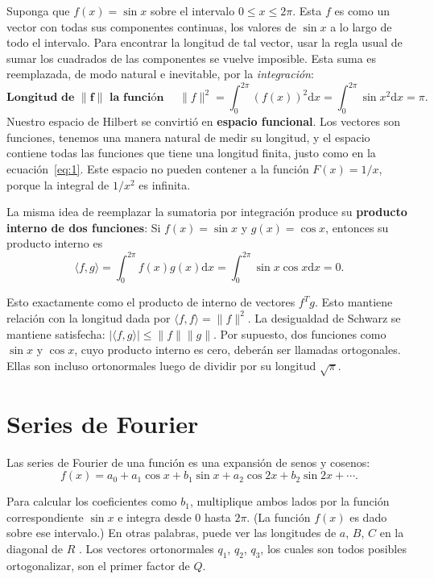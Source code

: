 \documentclass[a4paper]{memoir}
\begin{document}
Suponga que $f(x)=\sin x$ sobre el intervalo $0\le x\le 2\pi$. Esta $f$ es como un vector con todas sus componentes continuas, los valores de $\sin x$ a lo largo de todo el intervalo. Para encontrar la longitud de tal vector, usar la regla usual de sumar los cuadrados de las componentes se vuelve imposible. Esta suma es reemplazada, de modo natural e inevitable, por la \emph{integración}:
\begin{equation}
  \label{eq:2}
  \textbf{Longitud de }\|\bm{f}\|\textbf{ la función }\quad\|f\|^2=\int_0^{2\pi}{(f(x))}^2\mathrm{d}x=\int_0^{2\pi}{\sin x}^2\mathrm{d}x=\pi.
\end{equation}
Nuestro espacio de Hilbert se convirtió en \textbf{espacio funcional}. Los vectores son funciones, tenemos una manera natural de medir su longitud, y el espacio contiene todas las funciones que tiene una longitud finita, justo como en la ecuación~\ref{eq:1}. Este espacio no pueden contener a la función $F(x)=1/x$, porque la integral de $1/x^2$ es infinita.

La misma idea de reemplazar la sumatoria por integración produce su \textbf{producto interno de dos funciones}: Si $f(x)=\sin x$ y $g(x)=\cos x$, entonces su producto interno es
\begin{equation}
  \label{eq:3}
  \langle f,g\rangle={\int}_{0}^{2\pi}f(x)g(x)\mathrm{d}x=\int_{0}^{2\pi}\sin x\cos x\mathrm{d}x=0.
\end{equation}

Esto exactamente como el producto de interno de vectores $f^Tg$. Esto mantiene relación con la longitud dada por $\langle f,f\rangle=\|f\|^2$. La desigualdad de Schwarz se mantiene satisfecha: $|\langle f,g \rangle|\le \|f\|\|g\|$. Por supuesto, dos funciones como $\sin x$ y $\cos x$, cuyo producto interno es cero, deberán ser llamadas ortogonales. Ellas son incluso ortonormales luego de dividir por su longitud $\sqrt{\pi}$.

\section{Series de Fourier}
Las series de Fourier de una función es una expansión de senos y cosenos:
\begin{equation}
  f(x)=a_0+a_1\cos x+b_1\sin x+a_2\cos 2x+b_2\sin 2x+\cdots.
\end{equation}

Para calcular los coeficientes como $b_1$, multiplique ambos lados por la función correspondiente $\sin x$ e integra desde $0$ hasta $2\pi$. (La función $f(x)$ es dado sobre ese intervalo.) En otras palabras, puede ver las longitudes de $a$, $B$, $C$ en la diagonal de $R$ . Los vectores ortonormales $q_1$, $q_2$, $q_3$, los cuales son todos posibles ortogonalizar, son el primer factor de $Q$.
\end{document}
